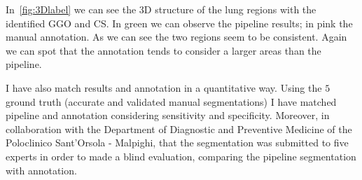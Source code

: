 \documentclass{standalone}
\begin{document}
	In \figurename\,\ref{fig:3Dlabel} we can see the 3D structure of the lung regions with the identified GGO and CS. In green we can observe the pipeline results; in pink the manual annotation. As we can see the two regions seem to be consistent. Again we can spot that the  annotation tends to consider a larger areas than the pipeline.
	
	I have also match results and annotation in a quantitative way. Using the $5$ ground truth (accurate and validated manual segmentations) I have matched pipeline and annotation considering sensitivity and specificity.
	Moreover, in collaboration with the Department of Diagnostic and Preventive Medicine of the Poloclinico Sant'Orsola - Malpighi, that the segmentation was submitted to five experts in order to made a blind evaluation, comparing the pipeline segmentation with annotation. 
	
	
	
\end{document}
